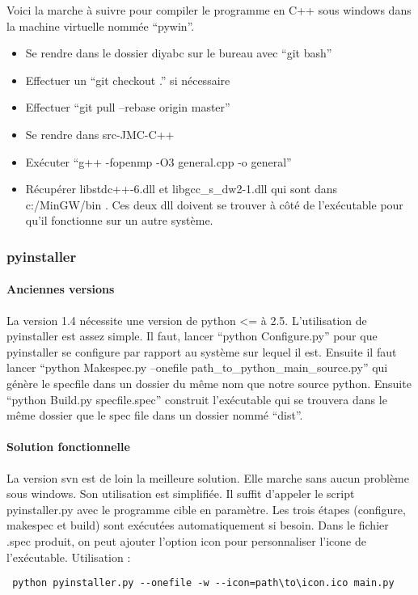 \documentclass[12pt,a4paper]{article}
\begin{document}
        Voici la marche à suivre pour compiler le programme en C++ sous windows
        dans la machine virtuelle nommée ``pywin''.\\


        \begin{itemize}
            \item Se rendre dans le dossier diyabc sur le bureau avec ``git
                bash''
            \item Effectuer un ``git checkout .'' si nécessaire
            \item Effectuer ``git pull --rebase origin master''
            \item Se rendre dans src-JMC-C++
            \item Exécuter ``g++ -fopenmp -O3 general.cpp -o general''
            \item Récupérer libstdc++-6.dll et libgcc\_s\_dw2-1.dll qui sont
                dans c:/MinGW/bin . Ces deux dll doivent se trouver à côté de
                l'exécutable pour qu'il fonctionne sur un autre système.
        \end{itemize}
        \subsubsection{pyinstaller}

        \paragraph{Anciennes versions}

        La version 1.4 nécessite une version de python <= à 2.5. L'utilisation
        de pyinstaller est assez simple. Il faut, lancer ``python Configure.py''
        pour que pyinstaller se configure par rapport au système sur lequel il
        est. Ensuite il faut lancer ``python Makespec.py --onefile
        path\_to\_python\_main\_source.py'' qui génère le specfile dans un
        dossier du même nom que notre source python. Ensuite ``python Build.py
        specfile.spec'' construit l'exécutable qui se trouvera dans le même
        dossier que le spec file dans un dossier nommé ``dist''.

        \paragraph{Solution fonctionnelle}

        La version svn est de loin la meilleure solution. Elle marche sans aucun
        problème sous windows. Son utilisation est simplifi\'ee.  Il suffit
        d'appeler le script pyinstaller.py avec le programme cible en paramètre.
        Les trois \'etapes (configure, makespec et build) sont ex\'ecut\'ees
        automatiquement si besoin. Dans le fichier .spec produit, on peut
        ajouter l'option icon pour personnaliser l'icone de l'ex\'ecutable.
		Utilisation : \begin{verbatim} python pyinstaller.py --onefile -w --icon=path\to\icon.ico main.py \end{verbatim}
\end{document}
